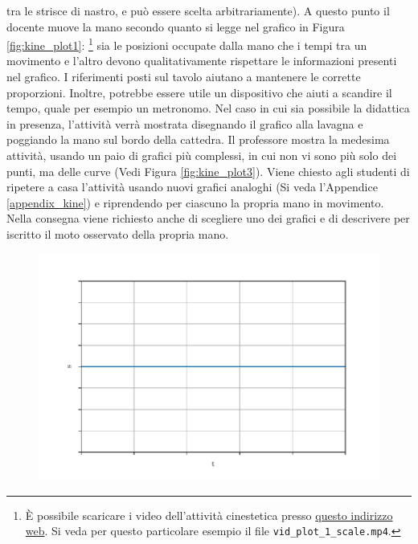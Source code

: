 \documentclass{report} \usepackage[T1]{fontenc} \usepackage[italian]{babel}
\begin{document}
tra le strisce di nastro, e può essere scelta arbitrariamente). A questo
punto il docente muove la mano secondo quanto
si legge nel grafico in Figura \ref{fig:kine_plot1}:
\footnote{\`E possibile scaricare i video dell'attività cinestetica presso
            \textcolor{blue}{\href{https://github.com/savaroskij/PED1/tree/master/progetto_finale/media/video/kine_videos_1}{questo indirizzo web}}.
            Si veda per questo particolare esempio il file \texttt{vid\_plot\_1\_scale.mp4}.
         }
sia le posizioni occupate dalla
mano che i tempi tra un movimento e l’altro devono qualitativamente
rispettare le informazioni presenti nel grafico. I riferimenti posti sul tavolo
aiutano a mantenere le corrette proporzioni. Inoltre, potrebbe essere utile un
dispositivo che aiuti a scandire il tempo, quale per esempio un metronomo. Nel
caso in cui sia possibile la didattica in presenza, l’attività verrà mostrata
disegnando il grafico alla lavagna e poggiando la mano sul bordo della
cattedra. Il professore mostra la medesima attività, usando un paio di grafici
più complessi, in cui non vi sono più solo dei punti, ma delle curve (Vedi Figura
\ref{fig:kine_plot3}).
Viene chiesto agli studenti di ripetere a casa l’attività usando
nuovi grafici analoghi (Si veda l'Appendice \ref{appendix_kine}) e riprendendo
per ciascuno la propria mano in movimento.
Nella consegna viene richiesto anche
di scegliere uno dei grafici e di descrivere per iscritto il moto osservato della
propria mano.

\begin{figure}[H]
\centering
  \includegraphics[width=\textwidth]{kine_plot2}
  \label{fig:kine_plot2}
\end{figure}
\end{document}
